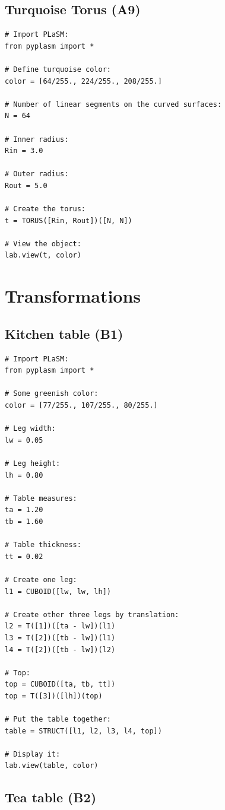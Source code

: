 \documentclass{article}
\begin{document}
\subsection{Turquoise Torus (A9)}

\begin{verbatim}
# Import PLaSM:
from pyplasm import *

# Define turquoise color:
color = [64/255., 224/255., 208/255.]

# Number of linear segments on the curved surfaces:
N = 64

# Inner radius:
Rin = 3.0

# Outer radius:
Rout = 5.0

# Create the torus:
t = TORUS([Rin, Rout])([N, N])

# View the object:
lab.view(t, color)
\end{verbatim}





\section{Transformations}

\subsection{Kitchen table (B1)}

\begin{verbatim}
# Import PLaSM:
from pyplasm import *

# Some greenish color:
color = [77/255., 107/255., 80/255.]

# Leg width:
lw = 0.05

# Leg height:
lh = 0.80

# Table measures:
ta = 1.20
tb = 1.60

# Table thickness:
tt = 0.02

# Create one leg:
l1 = CUBOID([lw, lw, lh])

# Create other three legs by translation:
l2 = T([1])([ta - lw])(l1)
l3 = T([2])([tb - lw])(l1)
l4 = T([2])([tb - lw])(l2)

# Top:
top = CUBOID([ta, tb, tt])
top = T([3])([lh])(top)

# Put the table together:
table = STRUCT([l1, l2, l3, l4, top])

# Display it:
lab.view(table, color)
\end{verbatim}


\subsection{Tea table (B2)}
\end{document}
